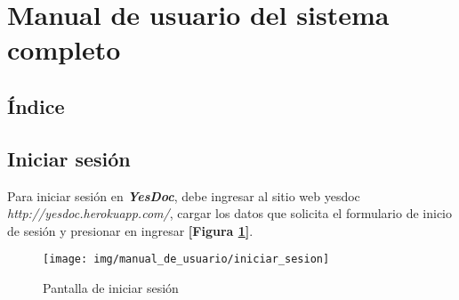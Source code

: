 \section{Manual de usuario del sistema completo}
\label{manual_usuario}


\subsection*{Índice}
\startcontents

\newpage

\subsection{Iniciar sesión}
Para iniciar sesión en \textbf{\textit{YesDoc}}, debe ingresar al sitio web yesdoc \textit{http://yesdoc.herokuapp.com/}, cargar los datos que solicita el formulario de inicio de sesión y presionar en ingresar \textbf{[Figura \ref{mu-iniciar_sesion}]}.
 \begin{figure}
 	\centering
 	\texttt{[image: img/manual\_de\_usuario/iniciar\_sesion]}
 	\caption{Pantalla de iniciar sesión}
 	\label{mu-iniciar_sesion}
 \end{figure}

